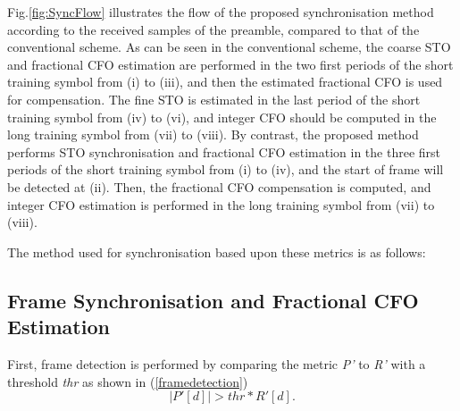 Fig.\ref{fig:SyncFlow} illustrates the flow of the proposed synchronisation method according to the received samples of the preamble, compared to that of the conventional scheme.
As can be seen in the conventional scheme, the coarse STO and fractional CFO estimation are performed in the two first periods of the short training symbol from (i) to (iii), and then the estimated fractional CFO is used for compensation. 
The fine STO is estimated in the last period of the short training symbol from (iv) to (vi), and integer CFO should be computed in the long training symbol from (vii) to (viii).
By contrast, the proposed method performs STO synchronisation and fractional CFO estimation in the three first periods of the short training symbol from (i) to (iv), and the start of frame will be detected at (ii).
Then, the fractional CFO compensation is computed, and integer CFO estimation is performed in the long training symbol from (vii) to (viii).

The method used for synchronisation based upon these metrics is as follows:

\subsection{Frame Synchronisation and Fractional CFO Estimation}

First, frame detection is performed by comparing the metric \emph{P'} to \emph{R'} with a threshold \emph{thr} as shown in (\ref{framedetection})
\begin{equation}
\label{framedetection}
|P'[d]| > thr * R'[d].
\end{equation} 

